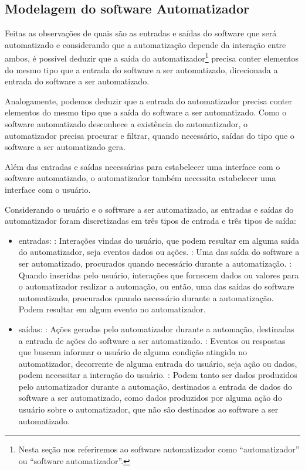 \documentclass[tg]{mdtufsm}
\begin{document}
            \subsection{Modelagem do software Automatizador}

                Feitas as observações de quais são as entradas e saídas do software que será automatizado e considerando que a automatização depende da interação entre ambos, é possível deduzir que a saída do automatizador\footnote{ Nesta seção nos referiremos ao software automatizador como “automatizador” ou “software automatizador”.} precisa conter elementos do mesmo tipo que a entrada do software a ser automatizado, direcionada a entrada do software a ser automatizado.

                Analogamente, podemos deduzir que a entrada do automatizador precisa conter elementos do mesmo tipo que a saída do software a ser automatizado. Como o software automatizado desconhece a existência do automatizador, o automatizador precisa procurar e filtrar, quando necessário, saídas do tipo que o software a ser automatizado gera.

                Além das entradas e saídas necessárias para estabelecer uma interface com o software automatizado, o automatizador também necessita estabelecer uma interface com o usuário.

                Considerando o usuário e o software a ser automatizado, as entradas e saídas do automatizador foram discretizadas em três tipos de entrada e três tipos de saída:

                \begin{itemize}
                    \item entradas:
                        : Interações vindas do usuário, que podem resultar em alguma saída do automatizador, seja eventos dados ou ações.
                        : Uma das saída do software a ser automatizado, procurados quando necessário durante a automatização.
                        : Quando inseridas pelo usuário, interações que fornecem dados ou valores para o automatizador realizar a automação, ou então, uma das saídas do software automatizado, procurados quando necessário durante a automatização. Podem resultar em algum evento no automatizador.
                    \item saídas:
                        : Ações geradas pelo automatizador durante a automação, destinadas a entrada de ações do software a ser automatizado.
                        : Eventos ou respostas que buscam informar o usuário de alguma condição atingida no automatizador, decorrente de alguma entrada do usuário, seja ação ou dados, podem necessitar a interação do usuário.
                        : Podem tanto ser dados produzidos pelo automatizador durante a automação, destinados a entrada de dados do software a ser automatizado, como dados produzidos por alguma ação do usuário sobre o automatizador, que não são destinados ao software a ser automatizado.
                \end{itemize}
\end{document}
